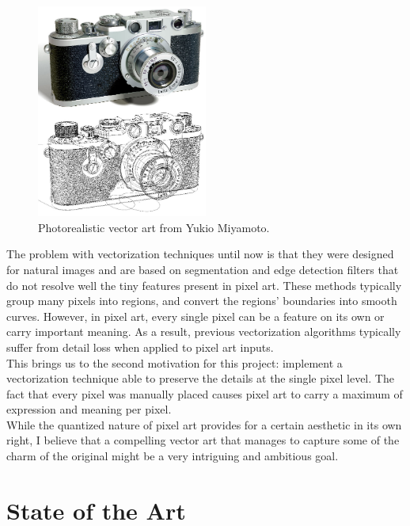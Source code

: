 \documentclass[]{usiinfbachelorproject}
\begin{document}
\begin{figure}
 	\centering
	\includegraphics[width=0.5\textwidth]{img/leica.png}
  	\caption{Photorealistic vector art from Yukio Miyamoto.}
	\label{fig:leica}
\end{figure}

\noindent The problem with vectorization techniques until now is that they were designed for natural images and are based on segmentation and edge detection filters that do not resolve well the tiny features present in pixel art. These methods typically group many pixels into regions, and convert the regions' boundaries into smooth curves. However, in pixel art, every single pixel can be a feature on its own or carry important meaning. As a result, previous vectorization algorithms typically suffer from detail loss when applied to pixel art inputs.\\
This brings us to the second motivation for this project: implement a vectorization technique able to preserve the details at the single pixel level. The fact that every pixel was manually placed causes pixel art to carry a maximum of expression and meaning per pixel. \\
While the quantized nature of pixel art provides for a certain aesthetic in its own right, I believe that a compelling vector art that manages to capture some of the charm of the original might be a very intriguing and ambitious goal.

\newpage 

\section{State of the Art} \label{sec:state}
\end{document}
